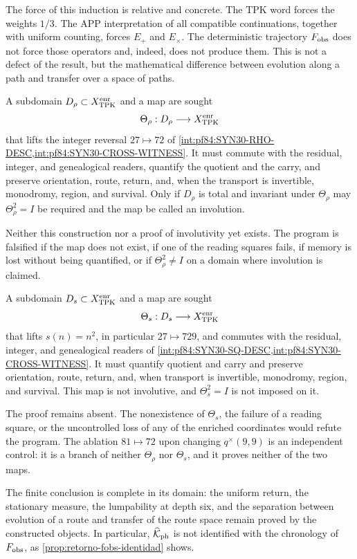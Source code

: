 The force of this induction is relative and concrete. The TPK word forces the
weights \(1/3\). The APP interpretation of all compatible continuations,
together with uniform counting, forces \(E_+\) and \(E_\times\). The deterministic
trajectory \(F_{\rm obs}\) does not force those operators and, indeed, does not
produce them. This is not a defect of the result, but the mathematical difference
between evolution along a path and transfer over a space of paths.

\ifdefined\HMTInternalTraceability
\begin{criterion}
\label{pf84:SYN31-RHO-LIFT}
A subdomain \(D_\rho\subset X_{\rm TPK}^{\rm enr}\) and a map are sought
\[
 \Theta_\rho:D_\rho\longrightarrow X_{\rm TPK}^{\rm enr}
\]
that lifts the integer reversal \(27\mapsto72\) of
\cref{int:pf84:SYN30-RHO-DESC,int:pf84:SYN30-CROSS-WITNESS}. It must commute with the
residual, integer, and genealogical readers, quantify the quotient and the
carry, and preserve orientation, route, return, and, when the transport is
invertible, monodromy, region, and survival.
Only if \(D_\rho\) is total and invariant under \(\Theta_\rho\) may
\(\Theta_\rho^2=I\) be required and the map be called an involution.

Neither this construction nor a proof of involutivity yet exists. The
program is falsified if the map does not exist, if one of the reading squares
fails, if memory is lost without being quantified, or if
\(\Theta_\rho^2\ne I\) on a domain where involution is claimed.
\end{criterion}

\begin{criterion}
\label{pf84:SYN31-SQ-LIFT}
A subdomain \(D_s\subset X_{\rm TPK}^{\rm enr}\) and a map are sought
\[
 \Theta_s:D_s\longrightarrow X_{\rm TPK}^{\rm enr}
\]
that lifts \(s(n)=n^2\), in particular \(27\mapsto729\), and commutes with the
residual, integer, and genealogical readers of
\cref{int:pf84:SYN30-SQ-DESC,int:pf84:SYN30-CROSS-WITNESS}. It must quantify
quotient and carry and preserve orientation, route, return, and, when
transport is invertible, monodromy, region, and survival. This map is not
involutive, and
\(\Theta_s^2=I\) is not imposed on it.

The proof remains absent. The nonexistence of \(\Theta_s\), the failure of
a reading square, or the uncontrolled loss of any of the
enriched coordinates would refute the program. The ablation
\(81\mapsto72\) upon changing \(q^\times(9,9)\) is an independent control:
it is a branch of neither \(\Theta_\rho\) nor \(\Theta_s\), and it proves neither
of the two maps.
\end{criterion}
\fi

The finite conclusion is complete in its domain: the uniform return, the
stationary measure, the lumpability at depth six, and the separation
between evolution of a route and transfer of the route space remain
proved by the constructed objects. In particular,
\(\widehat{\mathcal K}_{\rm ph}\) is not identified with the chronology of
\(F_{\rm obs}\), as \cref{prop:retorno-fobs-identidad} shows.
